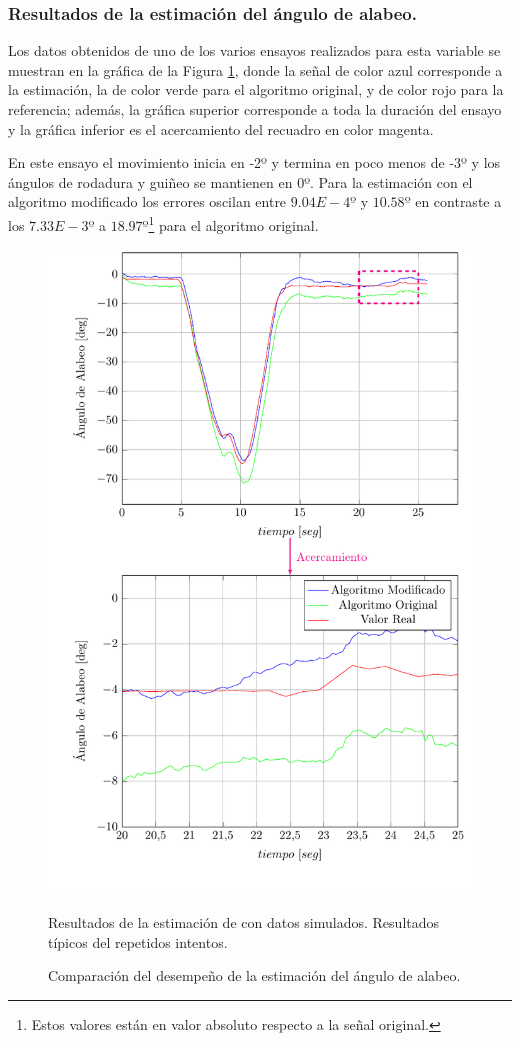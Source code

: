 \documentclass[10pt]{report}
\numberwithin{equation}{chapter}
\numberwithin{algorithm}{chapter}
\begin{document}
\subsubsection{Resultados de la estimación del ángulo de alabeo.}
Los datos obtenidos de uno de los varios ensayos realizados para esta variable se muestran en la gráfica de la Figura \ref{PlotPh1}, donde la señal de color azul corresponde a la estimación, la de color verde para el  algoritmo original, y de color rojo para la referencia; además, la gráfica superior corresponde a toda la duración del ensayo y la gráfica inferior es el acercamiento del recuadro en color magenta.\par
En este ensayo el movimiento inicia en -2º y termina en poco menos de -3º y los ángulos de rodadura y guiñeo se mantienen en 0º. Para la estimación con el algoritmo modificado los errores oscilan entre $9.04E-4º$ y $10.58º$ en contraste a los $7.33E-3º$ a $18.97º$\footnote{Estos valores están en valor absoluto respecto a la señal original.} para el algoritmo original. 
\begin{figure}
\begin{center}
\includegraphics[scale=0.8]
{PlotPh25a.pdf}
\caption{Comparación del desempeño de la estimación del ángulo de alabeo.}
\scriptsize{Resultados de la estimación de con datos simulados. Resultados típicos del repetidos intentos.}
\label{PlotPh1}
\end{center}
\end{figure}
\end{document}
